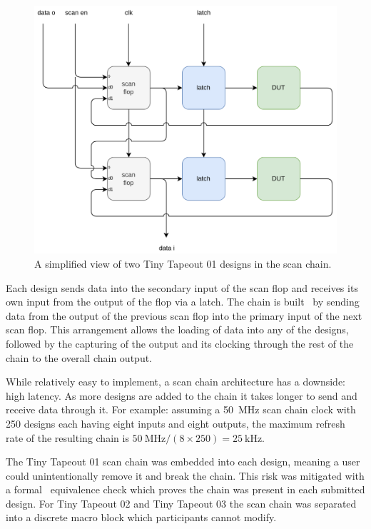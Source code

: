 \begin{figure}[!t]
\centering
\includegraphics[width=\columnwidth]{./Figs/scanchain_block_diagram.png}
\caption{A simplified view of two Tiny Tapeout 01 designs in the scan chain.}
\label{fig:simplified_view_2_designs}
\end{figure}

Each design sends data into the secondary input of the scan flop and receives its own input from the output of the flop via a latch.
The chain is built~\cite{updateiodesign} by sending data from the output of the previous scan flop into the primary input of the next scan flop.
This arrangement allows the loading of data into any of the designs, followed by the capturing of the output and its clocking through the rest of the chain to the overall chain output.

While relatively easy to implement, a scan chain architecture has a downside: high latency.
As more designs are added to the chain it takes longer to send and receive data through it.
For example: assuming a \qty{50}{\MHz} scan chain clock with 250 designs each having eight inputs and eight outputs, the maximum refresh rate of the resulting chain is $\qty{50}{\MHz} / (8 \times 250) = \qty{25}{\kHz}$.

The Tiny Tapeout 01 scan chain was embedded into each design, meaning a user could unintentionally remove it and break the chain.
This risk was mitigated with a formal~\cite{tinytapeoutscan} equivalence check which proves the chain was present in each submitted design.
For Tiny Tapeout 02 and Tiny Tapeout 03 the scan chain was separated into a discrete macro block which participants cannot modify.

